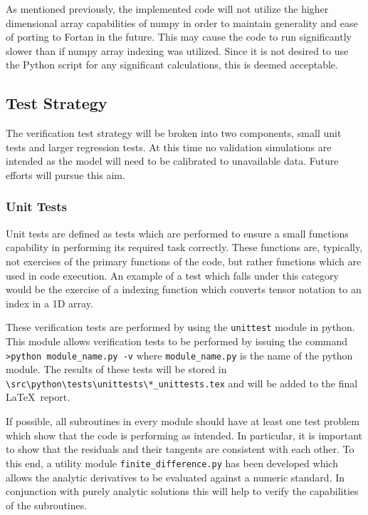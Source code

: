 As mentioned previously, the implemented code will not utilize the higher dimensional array capabilities of numpy in order to maintain generality and ease of porting to Fortan in the future. This may cause the code to run significantly slower than if numpy array indexing was utilized. Since it is not desired to use the Python script for any significant calculations, this is deemed acceptable.



\subsection{Test Strategy}

The verification test strategy will be broken into two components, small unit tests and larger regression tests. At this time no validation simulations are intended as the model will need to be calibrated to unavailable data. Future efforts will pursue this aim.

\subsubsection{Unit Tests}

Unit tests are defined as tests which are performed to ensure a small functions capability in performing its required task correctly. These functions are, typically, not exercises of the primary functions of the code, but rather functions which are used in code execution. An example of a test which falls under this category would be the exercise of a indexing function which converts tensor notation to an index in a 1D array.

These verification tests are performed by using the \verb|unittest| module in python. This module allows verification tests to be performed by issuing the command \verb|>python module_name.py -v| where \verb|module_name.py| is the name of the python module. The results of these tests will be stored in \verb|\src\python\tests\unittests\*_unittests.tex| and will be added to the final \LaTeX~report.

If possible, all subroutines in every module should have at least one test problem which show that the code is performing as intended. In particular, it is important to show that the residuals and their tangents are consistent with each other. To this end, a utility module \verb|finite_difference.py| has been developed which allows the analytic derivatives to be evaluated against a numeric standard. In conjunction with purely analytic solutions this will help to verify the capabilities of the subroutines.

